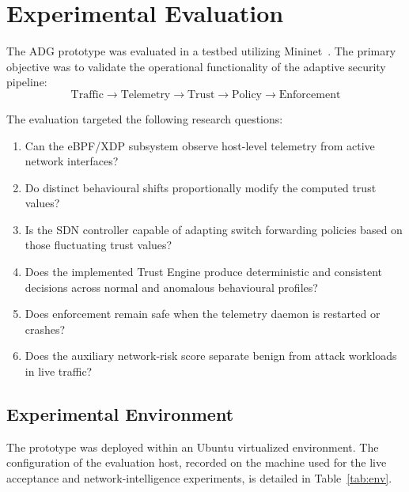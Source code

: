 \documentclass[conference]{IEEEtran}
\begin{document}

\section{Experimental Evaluation}

The ADG prototype was evaluated in a testbed utilizing Mininet~\cite{lantz2010mininet}. The primary objective was to validate the operational functionality of the adaptive security pipeline:
\begin{equation}
\text{Traffic} \rightarrow \text{Telemetry} \rightarrow \text{Trust} \rightarrow \text{Policy} \rightarrow \text{Enforcement}
\end{equation}

The evaluation targeted the following research questions:
\begin{enumerate}
\item Can the eBPF/XDP subsystem observe host-level telemetry from active network interfaces?
\item Do distinct behavioural shifts proportionally modify the computed trust values?
\item Is the SDN controller capable of adapting switch forwarding policies based on those fluctuating trust values?
\item Does the implemented Trust Engine produce deterministic and consistent decisions across normal and anomalous behavioural profiles?
\item Does enforcement remain safe when the telemetry daemon is restarted or crashes?
\item Does the auxiliary network-risk score separate benign from attack workloads in live traffic?
\end{enumerate}

\subsection{Experimental Environment}
The prototype was deployed within an Ubuntu virtualized environment. The configuration of the evaluation host, recorded on the machine used for the live acceptance and network-intelligence experiments, is detailed in Table~\ref{tab:env}.
\end{document}
